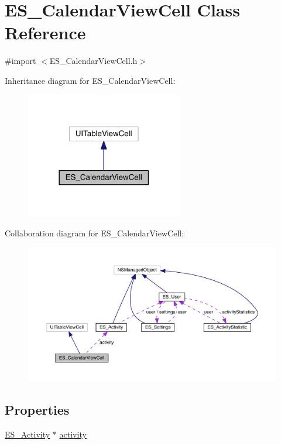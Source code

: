 \hypertarget{interface_e_s___calendar_view_cell}{\section{E\+S\+\_\+\+Calendar\+View\+Cell Class Reference}
\label{interface_e_s___calendar_view_cell}
}


{\ttfamily \#import $<$E\+S\+\_\+\+Calendar\+View\+Cell.\+h$>$}



Inheritance diagram for E\+S\+\_\+\+Calendar\+View\+Cell\+:\nopagebreak
\begin{figure}[H]
\begin{center}
\leavevmode
\includegraphics[width=194pt]{df/d7b/interface_e_s___calendar_view_cell__inherit__graph}
\end{center}
\end{figure}


Collaboration diagram for E\+S\+\_\+\+Calendar\+View\+Cell\+:\nopagebreak
\begin{figure}[H]
\begin{center}
\leavevmode
\includegraphics[width=350pt]{de/d69/interface_e_s___calendar_view_cell__coll__graph}
\end{center}
\end{figure}
\subsection*{Properties}
\begin{DoxyCompactItemize}
\item 
\hyperlink{interface_e_s___activity}{E\+S\+\_\+\+Activity} $\ast$ \hyperlink{interface_e_s___calendar_view_cell_afdfb7a1cac0ee17928aa2634d89e8e8e}{activity}
\end{DoxyCompactItemize}


